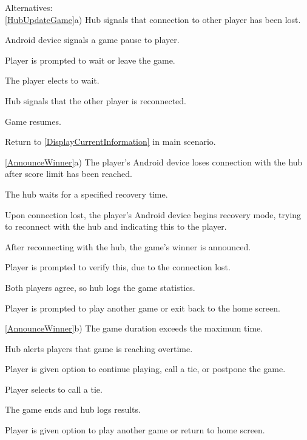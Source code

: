 \documentclass[12pt]{article}
\newenvironment{enumerate*}%
  {\begin{enumerate}%
  	\setlength{\parsep}{0pt}
    \setlength{\itemsep}{0pt}%
    \setlength{\parskip}{0pt}}%
  {\end{enumerate}}
\begin{document}
Alternatives:\\
\ref{HubUpdateGame}a) Hub signals that connection to other player has been lost.
\begin{enumerate*}
\item Android device signals a game pause to player.
\item Player is prompted to wait or leave the game.
\item The player elects to wait.
\item Hub signals that the other player is reconnected.
\item Game resumes.
\item Return to \ref{DisplayCurrentInformation} in main scenario.
\end{enumerate*}
\ref{AnnounceWinner}a) The player's Android device loses connection with the hub after score limit has been reached.
\begin{enumerate*}
\item The hub waits for a specified recovery time.
\item Upon connection lost, the player's Android device begins recovery mode, trying to reconnect with the hub and indicating this to the player.
\item After reconnecting with the hub, the game's winner is announced.  
\item Player is prompted to verify this, due to the connection lost. 
\item Both players agree, so hub logs the game statistics.
\item Player is prompted to play another game or exit back to the home screen.
\end{enumerate*}
\ref{AnnounceWinner}b) The game duration exceeds the maximum time.
\begin{enumerate*}
\item Hub alerts players that game is reaching overtime.
\item Player is given option to continue playing, call a tie, or postpone the game.
\item Player selects to call a tie. 
\item The game ends and hub logs results.
\item Player is given option to play another game or return to home screen.
\end{enumerate*}
\end{document}
